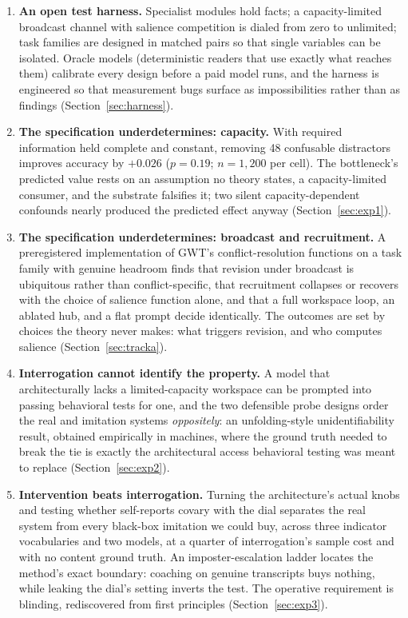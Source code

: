\documentclass[11pt]{article}
\begin{document}
\begin{enumerate}
  \item \textbf{An open test harness.} Specialist modules hold facts; a
  capacity-limited broadcast channel with salience competition is dialed from zero
  to unlimited; task families are designed in matched pairs so that single
  variables can be isolated. Oracle models (deterministic readers that use exactly
  what reaches them) calibrate every design before a paid model runs, and the
  harness is engineered so that measurement bugs surface as impossibilities rather
  than as findings (Section~\ref{sec:harness}).

  \item \textbf{The specification underdetermines: capacity.} With required
  information held complete and constant, removing 48 confusable distractors
  improves accuracy by $+0.026$ ($p=0.19$; $n=1{,}200$ per cell). The bottleneck's
  predicted value rests on an assumption no theory states, a capacity-limited
  consumer, and the substrate falsifies it; two silent capacity-dependent
  confounds nearly produced the predicted effect anyway
  (Section~\ref{sec:exp1}).

  \item \textbf{The specification underdetermines: broadcast and recruitment.} A
  preregistered implementation of GWT's conflict-resolution functions on a task
  family with genuine headroom finds that revision under broadcast is ubiquitous
  rather than conflict-specific, that recruitment collapses or recovers with the
  choice of salience function alone, and that a full workspace loop, an ablated
  hub, and a flat prompt decide identically. The outcomes are set by choices the theory
  never makes: what triggers revision, and who computes salience
  (Section~\ref{sec:tracka}).

  \item \textbf{Interrogation cannot identify the property.} A model that
  architecturally lacks a limited-capacity workspace can be prompted into passing
  behavioral tests for one, and the two defensible probe designs order the real
  and imitation systems \emph{oppositely}: an unfolding-style unidentifiability
  result, obtained empirically in machines, where the ground truth needed to
  break the tie is exactly the architectural access behavioral testing was meant
  to replace (Section~\ref{sec:exp2}).

  \item \textbf{Intervention beats interrogation.} Turning the architecture's
  actual knobs and testing whether self-reports covary with the dial separates
  the real system from every black-box imitation we could buy, across three
  indicator vocabularies and two models, at a quarter of interrogation's sample
  cost and with no content ground truth. An imposter-escalation ladder locates
  the method's exact boundary: coaching on genuine transcripts buys nothing,
  while leaking the dial's setting inverts the test. The operative requirement
  is blinding, rediscovered from first principles (Section~\ref{sec:exp3}).
\end{enumerate}
\end{document}
